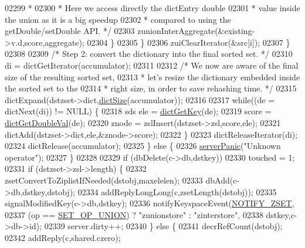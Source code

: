 \begin{DoxyCode}
02299 \textcolor{comment}{                     *}
02300 \textcolor{comment}{                     * Here we access directly the dictEntry double}
02301 \textcolor{comment}{                     * value inside the union as it is a big speedup}
02302 \textcolor{comment}{                     * compared to using the getDouble/setDouble API. */}
02303                     zunionInterAggregate(&existing->v.d,score,aggregate);
02304                 \}
02305             \}
02306             zuiClearIterator(&src[i]);
02307         \}
02308 
02309         \textcolor{comment}{/* Step 2: convert the dictionary into the final sorted set. */}
02310         di = dictGetIterator(accumulator);
02311 
02312         \textcolor{comment}{/* We now are aware of the final size of the resulting sorted set,}
02313 \textcolor{comment}{         * let's resize the dictionary embedded inside the sorted set to the}
02314 \textcolor{comment}{         * right size, in order to save rehashing time. */}
02315         dictExpand(dstzset->dict,\hyperlink{dict_8h_af193430dd3d5579a52b194512f72c1f0}{dictSize}(accumulator));
02316 
02317         \textcolor{keywordflow}{while}((de = dictNext(di)) != NULL) \{
02318             sds ele = \hyperlink{dict_8h_a3271c334309904a3086deca94f96e46e}{dictGetKey}(de);
02319             score = \hyperlink{dict_8h_a4e673a942df4ba0fc35665c26c9d226c}{dictGetDoubleVal}(de);
02320             znode = zslInsert(dstzset->zsl,score,ele);
02321             dictAdd(dstzset->dict,ele,&znode->score);
02322         \}
02323         dictReleaseIterator(di);
02324         dictRelease(accumulator);
02325     \} \textcolor{keywordflow}{else} \{
02326         \hyperlink{server_8h_a11cc378e7778a830b41240578de3b204}{serverPanic}(\textcolor{stringliteral}{"Unknown operator"});
02327     \}
02328 
02329     \textcolor{keywordflow}{if} (dbDelete(c->db,dstkey))
02330         touched = 1;
02331     \textcolor{keywordflow}{if} (dstzset->zsl->length) \{
02332         zsetConvertToZiplistIfNeeded(dstobj,maxelelen);
02333         dbAdd(c->db,dstkey,dstobj);
02334         addReplyLongLong(c,zsetLength(dstobj));
02335         signalModifiedKey(c->db,dstkey);
02336         notifyKeyspaceEvent(\hyperlink{server_8h_ab8516a5a3ff1b9eb5f1cb303abef0d2f}{NOTIFY\_ZSET},
02337             (op == \hyperlink{server_8h_af00a414b6d78bff8b325eb9cf82c3edb}{SET\_OP\_UNION}) ? \textcolor{stringliteral}{"zunionstore"} : \textcolor{stringliteral}{"zinterstore"},
02338             dstkey,c->db->id);
02339         server.dirty++;
02340     \} \textcolor{keywordflow}{else} \{
02341         decrRefCount(dstobj);
02342         addReply(c,shared.czero);

\end{DoxyCode}

